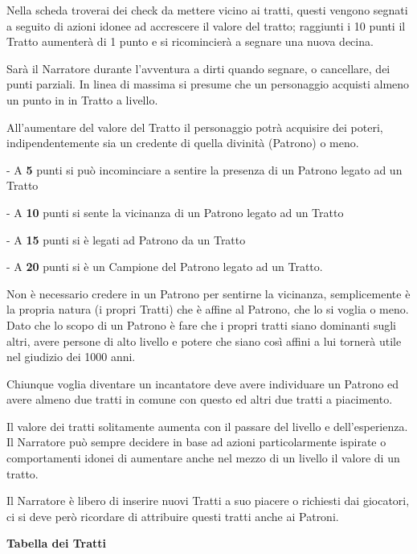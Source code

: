 \documentclass[a4paper,11pt,twoside,openany]{book}
\begin{document}
Nella scheda troverai dei check da mettere vicino ai tratti, questi vengono segnati a seguito di azioni idonee ad accrescere il valore del tratto; raggiunti i 10 punti il Tratto aumenterà di 1 punto e si ricomincierà a segnare una nuova decina.

Sarà il Narratore durante l'avventura a dirti quando segnare, o cancellare, dei punti parziali. In linea di massima si presume che un personaggio acquisti almeno un punto in in Tratto a livello.

All'aumentare del valore del Tratto il personaggio potrà acquisire dei poteri, indipendentemente sia un credente di quella divinità (Patrono) o meno.


- A \textbf{5} punti si può incominciare a sentire la presenza di un Patrono legato ad un Tratto

- A \textbf{10} punti si sente la vicinanza di un Patrono legato ad un Tratto

- A \textbf{15}  punti si è legati ad Patrono da un Tratto

- A \textbf{20} punti si è un Campione del Patrono legato ad un Tratto.


Non è necessario credere in un Patrono per sentirne la vicinanza, semplicemente è la propria natura (i propri Tratti) che è affine al Patrono, che lo si voglia o meno.
Dato che lo scopo di un Patrono è fare che i propri tratti siano dominanti sugli altri, avere persone di alto livello e potere che siano così affini a lui tornerà utile nel giudizio dei 1000 anni.

Chiunque voglia diventare un incantatore deve avere individuare un Patrono ed avere almeno due tratti in comune con questo ed altri due tratti a piacimento.

\smallskip

Il valore dei tratti solitamente aumenta con il passare del livello e dell'esperienza. Il Narratore può sempre decidere in base ad azioni particolarmente ispirate o comportamenti idonei di aumentare anche nel mezzo di un livello il valore di un tratto.

Il Narratore è libero di inserire nuovi Tratti a suo piacere o richiesti dai giocatori, ci si deve però ricordare di attribuire questi tratti anche ai Patroni.

\bigskip

\pagebreak

\textbf{Tabella dei Tratti}

\bigskip
\end{document}
